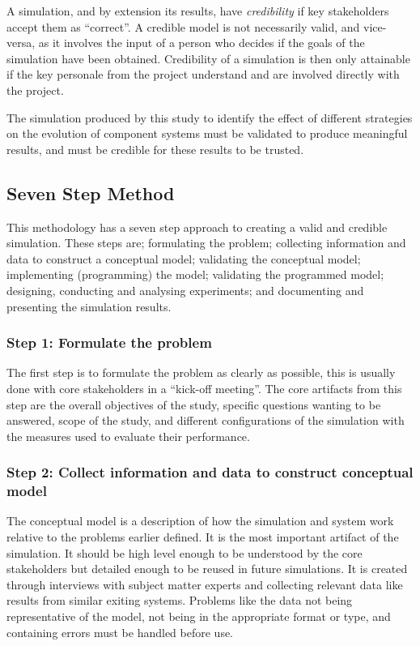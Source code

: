 A simulation, and by extension its results, have \textit{credibility} if key stakeholders accept them as ``correct''.
A credible model is not necessarily valid, and vice-versa, as it involves the input of a person who decides if the goals of the simulation have been obtained.
Credibility of a simulation is then only attainable if the key personale from the project understand and are involved directly with the project.

The simulation produced by this study to identify the effect of different strategies on the evolution of component systems must be validated to produce meaningful results,
and must be credible for these results to be trusted.

\subsection{Seven Step Method}
This methodology has a seven step approach to creating a valid and credible simulation.
These steps are; formulating the problem; collecting information and data to construct a conceptual model; validating the conceptual model;
implementing (programming) the model; validating the programmed model; designing, conducting and analysing experiments; and documenting and presenting the simulation results.

\subsubsection{Step 1: Formulate the problem}
The first step is to formulate the problem as clearly as possible, this is usually done with core stakeholders in a ``kick-off meeting''.
The core artifacts from this step are the overall objectives of the study, specific questions wanting to be answered, scope of the study,
 and different configurations of the simulation with the measures used to evaluate their performance. 

\subsubsection{Step 2: Collect information and data to construct conceptual model}
The conceptual model is a description of how the simulation and system work relative to the problems earlier defined.
It is the most important artifact of the simulation.
It should be high level enough to be understood by the core stakeholders but detailed enough to be reused in future simulations.
It is created through interviews with subject matter experts and collecting relevant data like results from similar exiting systems.
Problems like the data not being representative of the model, not being in the appropriate format or type, and containing errors must be handled before use.

